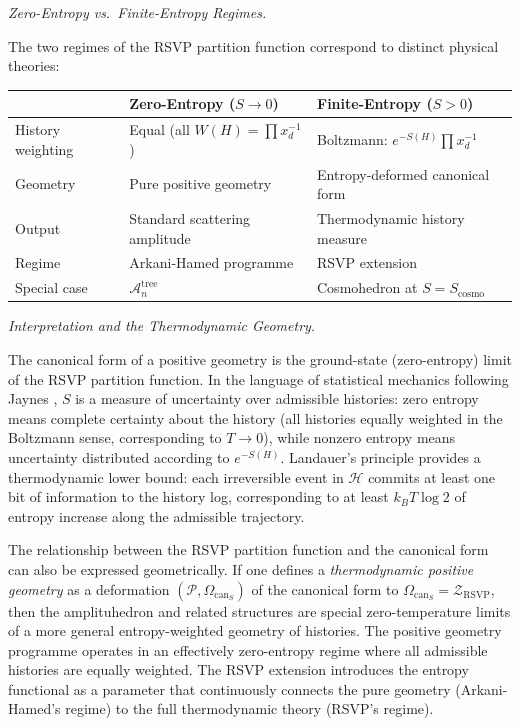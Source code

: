 \documentclass[11pt]{article}
\theoremstyle{plain}
\theoremstyle{definition}
\theoremstyle{remark}
\newcommand{\Sf}{S}
\newcommand{\HKS}{\mathcal{H}}
\newcommand{\CF}{\Omega_{\mathrm{can}}}
\newcommand{\ZRSVP}{\mathcal{Z}_{\mathrm{RSVP}}}
\begin{document}
\medskip\noindent\textit{Zero-Entropy vs.\ Finite-Entropy Regimes.}

The two regimes of the RSVP partition function correspond to distinct physical theories:

\begin{center}
\begin{tabular}{lll}
\toprule
 & Zero-Entropy ($\Sf\to 0$) & Finite-Entropy ($\Sf > 0$) \\
\midrule
History weighting & Equal (all $W(H)=\prod x_d^{-1}$) & Boltzmann: $e^{-\Sf(H)}\prod x_d^{-1}$ \\
Geometry & Pure positive geometry & Entropy-deformed canonical form \\
Output & Standard scattering amplitude & Thermodynamic history measure \\
Regime & Arkani-Hamed programme & RSVP extension \\
Special case & $\mathcal{A}_n^{\mathrm{tree}}$ & Cosmohedron at $\Sf=\Sf_{\mathrm{cosmo}}$ \\
\bottomrule
\end{tabular}
\end{center}

\medskip\noindent\textit{Interpretation and the Thermodynamic Geometry.}

The canonical form of a positive geometry is the ground-state (zero-entropy) limit of the RSVP partition function. In the language of statistical mechanics following Jaynes \cite{Jaynes1957}, $\Sf$ is a measure of uncertainty over admissible histories: zero entropy means complete certainty about the history (all histories equally weighted in the Boltzmann sense, corresponding to $T \to 0$), while nonzero entropy means uncertainty distributed according to $e^{-\Sf(H)}$. Landauer's principle \cite{Landauer1961} provides a thermodynamic lower bound: each irreversible event in $\HKS$ commits at least one bit of information to the history log, corresponding to at least $k_B T \log 2$ of entropy increase along the admissible trajectory.

The relationship between the RSVP partition function and the canonical form can also be expressed geometrically. If one defines a \emph{thermodynamic positive geometry} as a deformation $(\mathcal{P}, \CF_{\Sf})$ of the canonical form to $\CF_{\Sf} = \ZRSVP$, then the amplituhedron and related structures are special zero-temperature limits of a more general entropy-weighted geometry of histories. The positive geometry programme operates in an effectively zero-entropy regime where all admissible histories are equally weighted. The RSVP extension introduces the entropy functional as a parameter that continuously connects the pure geometry (Arkani-Hamed's regime) to the full thermodynamic theory (RSVP's regime).
\end{document}
